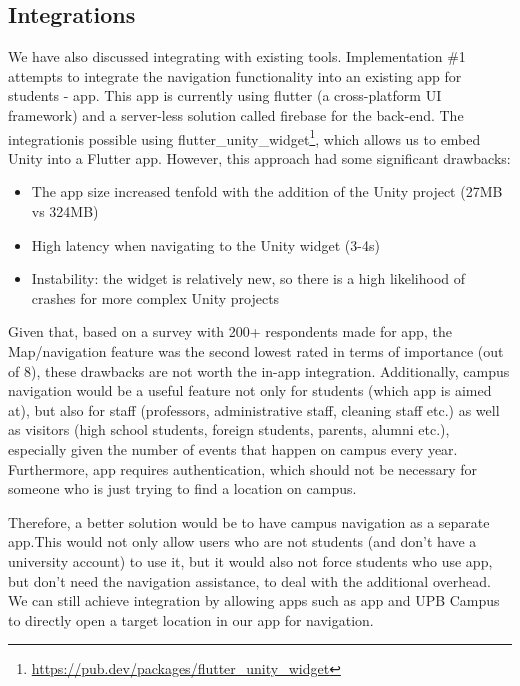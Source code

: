    \subsection{Integrations}
    
        We have also discussed integrating with existing tools. Implementation \#1 attempts to integrate the navigation functionality into an existing app for students - \gls{app}. This app is currently using \gls{flutter} (a cross-platform UI framework) and a server-less solution called \gls{firebase} for the back-end. The integrationis possible using flutter\_unity\_widget\footnote{\url{https://pub.dev/packages/flutter_unity_widget}}, which allows us to embed Unity into a Flutter app. However, this approach had some significant drawbacks:
        
        \begin{itemize}
            \item The app size increased tenfold with the addition of the Unity project (27MB vs 324MB)
            \item High latency when navigating to the Unity widget (3-4s)
            \item Instability: the widget is relatively new, so there is a high likelihood of crashes for more complex Unity projects
        \end{itemize}
        
        Given that, based on a survey with 200+ respondents\cite{alexandru2020acsupbmobile} made for \gls{app}, the Map/navigation feature was the second lowest rated in terms of importance (out of 8), these drawbacks are not worth the in-app integration. Additionally, campus navigation would be a useful feature not only for students (which \gls{app} is aimed at), but also for staff (professors, administrative staff, cleaning staff etc.) as well as visitors (high school students, foreign students, parents, alumni etc.), especially given the number of events that happen on campus every year. Furthermore, \gls{app} requires authentication, which should not be necessary for someone who is just trying to find a location on campus.
        
        Therefore, a better solution would be to have campus navigation as a separate app.This would not only allow users who are not students (and don’t have a university account) to use it, but it would also not force students who use \gls{app}, but don’t need the navigation assistance, to deal with the additional overhead. We can still achieve integration by allowing apps such as \gls{app} and UPB Campus to directly open a target location in our app for navigation.

